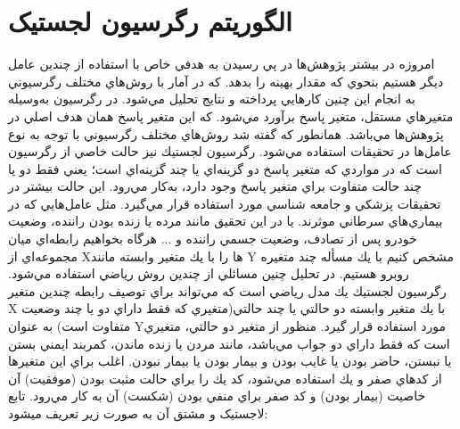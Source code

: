 \documentclass[10pt,a4paper]{article}
\begin{document}
\section{الگوریتم رگرسیون لجستیک}
امروزه در بيشتر پژوهش‌ها در پي رسيدن به هدفي خاص با استفاده از چندين عامل ديگر هستيم بنحوي كه مقدار بهينه را بدهد. كه در آمار با روش‌هاي مختلف رگرسيوني به انجام اين چنين كارهايي پرداخته و نتايج تحليل مي‌شود.
در رگرسيون به‌وسيله متغيرهاي مستقل، متغير پاسخ  برآورد مي‌شود. كه اين متغير پاسخ همان هدف اصلي در پژوهش‌ها مي‌باشد.
همانطور كه گفته شد روش‌هاي مختلف رگرسيوني با توجه به نوع عامل‌ها در تحقيقات استفاده مي‌شود. رگرسيون لجستيك نيز حالت خاصي از رگرسيون است كه در مواردي كه متغير پاسخ دو گزينه‌اي يا چند گزينه‌اي است؛ يعني فقط دو يا چند حالت متفاوت براي متغير پاسخ وجود دارد، به‌كار مي‌رود.
اين حالت بيشتر در تحقيقات پزشكي و جامعه شناسي مورد استفاده قرار مي‌گيرد. مثل عامل‌هايي كه در بيماري‌هاي سرطاني موثرند. يا در اين تحقيق مانند مرده يا زنده بودن راننده، وضعيت خودرو پس از تصادف، وضعيت جسمي راننده و ...
هرگاه بخواهيم رابطه‌اي ميان مجموعه‌اي از Xها را با يك متغير وابسته مانند Y مشخص كنيم با يك مسأله چند متغيره روبرو هستيم.
 در تحليل چنين مسائلي از چندين روش رياضي استفاده مي‌شود.
رگرسيون لجستيك يك مدل رياضي است كه مي‌تواند براي توصيف رابطه چندين متغير X با يك متغير وابسته دو حالتي يا چند حالتي(متغيري كه فقط داراي دو يا چند وضعيت متفاوت است) به عنوان  Yمورد استفاده قرار گيرد.
منظور از متغير دو حالتي، متغيري است كه فقط داراي دو جواب مي‌باشد، مانند مردن يا زنده ماندن، كمربند ايمني بستن يا نبستن، حاضر بودن يا غايب بودن و بيمار بودن يا بيمار نبودن. اغلب براي اين متغير‌ها از كدهاي صفر و يك استفاده مي‌شود، كد يك را براي حالت مثبت بودن (موفقيت) آن خاصيت (بيمار بودن) و كد صفر براي منفي بودن (شكست) آن به كار مي‌رود.
تابع لاجستیک و مشتق آن به صورت زیر تعریف میشود:
\end{document}
